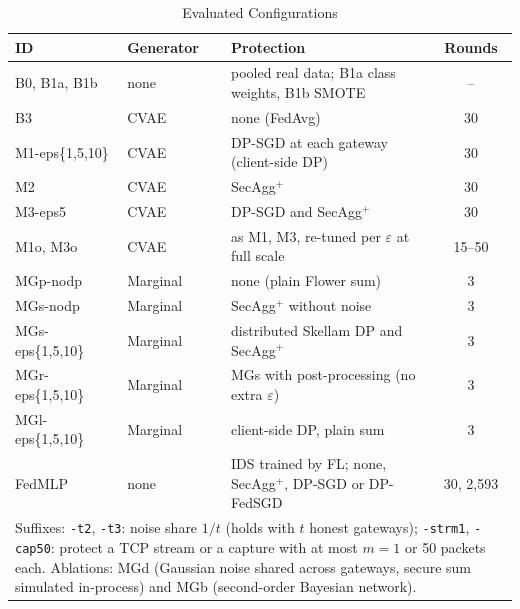 \documentclass[conference]{IEEEtran}
\begin{document}
\begin{table}[!t]
\centering
\caption{Evaluated Configurations}
\label{tab:configs}
\scriptsize
\setlength{\tabcolsep}{3pt}
\begin{tabularx}{\columnwidth}{l l >{\raggedright\arraybackslash}X c}
\toprule
\textbf{ID} & \textbf{Generator} & \textbf{Protection} & \textbf{Rounds} \\
\midrule
B0, B1a, B1b & none & pooled real data; B1a class weights, B1b SMOTE~\cite{chawla2002} & -- \\
B3           & CVAE & none (FedAvg) & 30 \\
M1-eps\{1,5,10\} & CVAE & DP-SGD at each gateway (client-side DP) & 30 \\
M2           & CVAE & SecAgg$^+$ & 30 \\
M3-eps5      & CVAE & DP-SGD and SecAgg$^+$ & 30 \\
M1o, M3o     & CVAE & as M1, M3, re-tuned per $\varepsilon$ at full scale & 15--50 \\
MGp-nodp     & Marginal & none (plain Flower sum) & 3 \\
MGs-nodp     & Marginal & SecAgg$^+$ without noise & 3 \\
MGs-eps\{1,5,10\} & Marginal & distributed Skellam DP and SecAgg$^+$ & 3 \\
MGr-eps\{1,5,10\} & Marginal & MGs with post-processing (no extra $\varepsilon$) & 3 \\
MGl-eps\{1,5,10\} & Marginal & client-side DP, plain sum & 3 \\
FedMLP       & none & IDS trained by FL; none, SecAgg$^+$, DP-SGD or DP-FedSGD & 30, 2,593 \\
\midrule
\multicolumn{4}{p{\dimexpr\columnwidth-2\tabcolsep\relax}}{Suffixes: \texttt{-t2}, \texttt{-t3}: noise share $1/t$ (holds with $t$ honest gateways); \texttt{-strm1}, \texttt{-cap50}: protect a TCP stream or a capture with at most $m = 1$ or 50 packets each. Ablations: MGd (Gaussian noise shared across gateways, secure sum simulated in-process) and MGb (second-order Bayesian network).} \\
\bottomrule
\end{tabularx}
\end{table}
\end{document}
